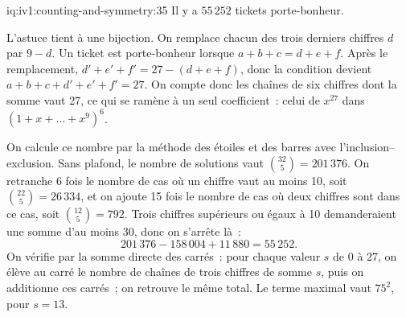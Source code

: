 \enlargethispage{-3\baselineskip}%
\begin{solution}{iq:iv1:counting-and-symmetry:35}
Il y a $55\,252$ tickets porte-bonheur.

L'astuce tient à une bijection. On remplace chacun des trois derniers chiffres $d$ par $9 - d$. Un ticket est porte-bonheur lorsque $a + b + c = d + e + f$. Après le remplacement, $d' + e' + f' = 27 - (d + e + f)$, donc la condition devient $a + b + c + d' + e' + f' = 27$. On compte donc les chaînes de six chiffres dont la somme vaut 27, ce qui se ramène à un seul coefficient~: celui de $x^{27}$ dans $(1 + x + \dots + x^9)^6$.

On calcule ce nombre par la méthode des étoiles et des barres avec l'inclusion--exclusion. Sans plafond, le nombre de solutions vaut $\binom{32}{5} = 201\,376$. On retranche 6 fois le nombre de cas où un chiffre vaut au moins 10, soit $\binom{22}{5} = 26\,334$, et on ajoute 15 fois le nombre de cas où deux chiffres sont dans ce cas, soit $\binom{12}{5} = 792$. Trois chiffres supérieurs ou égaux à 10 demanderaient une somme d'au moins 30, donc on s'arrête là~:
\[
201\,376 - 158\,004 + 11\,880 = 55\,252.
\]
On vérifie par la somme directe des carrés~: pour chaque valeur $s$ de 0 à 27, on élève au carré le nombre de chaînes de trois chiffres de somme $s$, puis on additionne ces carrés~; on retrouve le même total. Le terme maximal vaut $75^2$, pour $s = 13$.

\end{solution}

